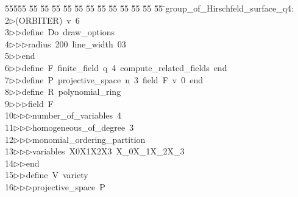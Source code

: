 %
%
\begin{tabbing}
55555 \= 55 \= 55 \= 55 \= 55 \= 55 \= 55 \= 55 \= 55 \= 55 \= 55 \= 55 \= 55 \= \>group\_of\_Hirschfeld\_surface\_q4:\\[0pt]
2\>$\triangleright$\>(ORBITER)\ v\ 6\ \\[0pt]
3\>$\triangleright$\>$\triangleright$\>define\ Do\ draw\_options\ \\[0pt]
4\>$\triangleright$\>$\triangleright$\>$\triangleright$\>radius\ 200\ line\_width\ 03\ \\[0pt]
5\>$\triangleright$\>$\triangleright$\>end\ \\[0pt]
6\>$\triangleright$\>$\triangleright$\>define\ F\ finite\_field\ q\ 4\ compute\_related\_fields\ end\ \\[0pt]
7\>$\triangleright$\>$\triangleright$\>define\ P\ projective\_space\ n\ 3\ field\ F\ v\ 0\ end\ \\[0pt]
8\>$\triangleright$\>$\triangleright$\>define\ R\ polynomial\_ring\ \\[0pt]
9\>$\triangleright$\>$\triangleright$\>$\triangleright$\>field\ F\ \\[0pt]
10\>$\triangleright$\>$\triangleright$\>$\triangleright$\>number\_of\_variables\ 4\ \\[0pt]
11\>$\triangleright$\>$\triangleright$\>$\triangleright$\>homogeneous\_of\_degree\ 3\ \\[0pt]
12\>$\triangleright$\>$\triangleright$\>$\triangleright$\>monomial\_ordering\_partition\ \\[0pt]
13\>$\triangleright$\>$\triangleright$\>$\triangleright$\>variables\ X0X1X2X3\ X\_0X\_1X\_2X\_3\ \\[0pt]
14\>$\triangleright$\>$\triangleright$\>end\ \\[0pt]
15\>$\triangleright$\>$\triangleright$\>define\ V\ variety\ \\[0pt]
16\>$\triangleright$\>$\triangleright$\>$\triangleright$\>projective\_space\ P\ \\[0pt]

\end{tabbing}
